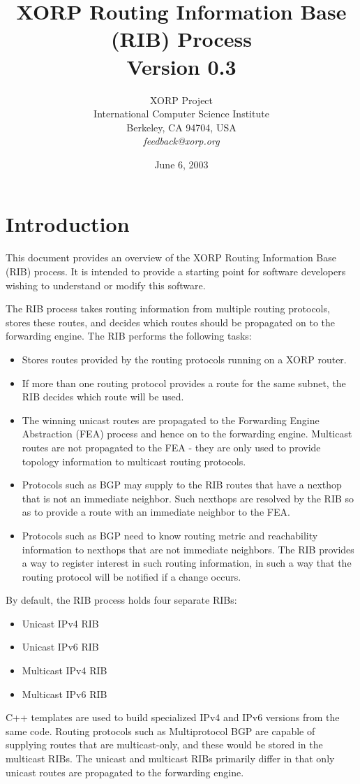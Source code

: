 \documentclass[11pt]{article}
\title{XORP Routing Information Base (RIB) Process \\
\vspace{1ex}
Version 0.3}
\author{ XORP Project					\\
	 International Computer Science Institute	\\
	 Berkeley, CA 94704, USA			\\
	 {\it feedback@xorp.org}
}
\date{June 6, 2003}
\begin{document}
\maketitle                            
\section{Introduction}
This document provides an overview of the XORP Routing Information
Base (RIB) process.  It is intended to provide a starting point for
software developers wishing to understand or modify this software.

The RIB process takes routing information from multiple routing
protocols, stores these routes, and decides which routes should be
propagated on to the forwarding engine.  The RIB performs the following
tasks:
\begin{itemize}
\item Stores routes provided by the routing protocols running on a
XORP router.
\item If more than one routing protocol provides a route for the same
subnet, the RIB decides which route will be used.
\item The winning unicast routes are propagated to the Forwarding
Engine Abstraction (FEA) process and hence on to the forwarding
engine.  Multicast routes are not propagated to the FEA - they are
only used to provide topology information to multicast routing
protocols.
\item Protocols such as BGP may supply to the RIB routes that have a
nexthop that is not an immediate neighbor.  Such nexthops are resolved
by the RIB so as to provide a route with an immediate neighbor to the
FEA.
\item Protocols such as BGP need to know routing metric and
reachability information to nexthops that are not immediate
neighbors.  The RIB provides a way to register interest in such
routing information, in such a way that the routing protocol will be
notified if a change occurs.
\end{itemize}
By default, the RIB process holds four separate RIBs:
\begin{itemize}
\item Unicast IPv4 RIB
\item Unicast IPv6 RIB
\item Multicast IPv4 RIB
\item Multicast IPv6 RIB
\end{itemize}
C++ templates are used to build specialized IPv4 and IPv6 versions
from the same code.  Routing protocols such as Multiprotocol BGP are
capable of supplying routes that are multicast-only, and these would
be stored in the multicast RIBs.  The unicast and multicast RIBs
primarily differ in that only unicast routes are propagated to the
forwarding engine.
\end{document}
